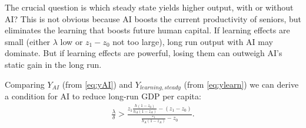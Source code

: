 \documentclass[12pt]{article}
\begin{document}
{The crucial question is which steady state yields higher output, with or without AI? This is not obvious because AI boosts the current productivity of seniors, but eliminates the learning that boosts future human capital. If learning effects are small (either \(\lambda\) low or \(z_1 - z_0\) not too large), long run output with AI may dominate. But if learning effects are powerful, losing them can outweigh AI's static gain in the long run.

Comparing $Y_{AI}$ (from \eqref{eq:yAI}) and $Y_{learning,steady}$ (from \eqref{eq:ylearn}) we can derive a condition for AI to reduce long-run GDP per capita:
\begin{align}\label{eq:ineffAI}
\frac{\lambda}{\delta}>\frac{z_1\frac{h(1-z_0)}{h_A(1-z_A)}-(z_1-z_0)}{\frac{z_1}{h_A(1-z_A)}-z_0}.
\end{align}


}
\end{document}
